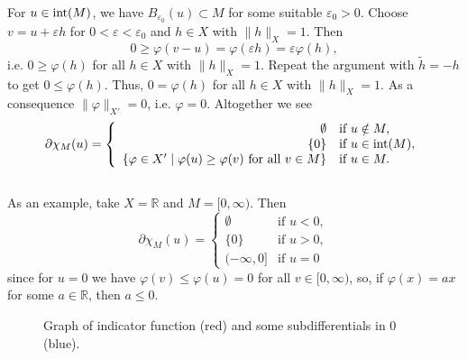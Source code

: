 For $u\in\operatorname{int}\mathopen{}\left(M\right)\mathclose{}$, we have $B_{\varepsilon_0}(u)\subset M$ for some suitable $\varepsilon_0>0$. Choose $v=u+\varepsilon h$ for $0<\varepsilon<\varepsilon_0$ and $h\in X$ with $\lVert h\rVert_X=1$. Then
\[0\geq\varphi(v-u)=\varphi(\varepsilon h)=\varepsilon\varphi(h),\]
i.e. $0\geq\varphi(h)$ for all $h\in X$ with $\lVert h\rVert_X=1$. Repeat the argument with $\tilde{h}=-h$ to get $0\leq\varphi(h)$. Thus, $0=\varphi(h)$ for all $h\in X$ with $\lVert h\rVert_X=1$. As a consequence $\lVert\varphi\rVert_{X'}=0$, i.e. $\varphi=0$. Altogether we see
\[\partial\chi_M(u)=\left\{\begin{array}{rl}
	\emptyset&\text{if }u\notin M,\\
	\{0\}&\text{if }u\in\operatorname{int}\mathopen{}\left(M\right)\mathclose{},\\
	\{\varphi\in X'\mid\varphi(u)\geq\varphi(v)\text{ for all }v\in M\}&\text{if }u\in M.
\end{array}\right.\]\\

As an example, take $X=\mathbb{R}$ and $M=[0,\infty)$. Then
\[\partial\chi_M(u)=\left\{\begin{array}{rl}
	\emptyset&\text{if }u<0,\\
	\{0\}&\text{if }u>0,\\
	(-\infty,0]&\text{if }u=0
\end{array}\right.\]
since for $u=0$ we have $\varphi(v)\leq\varphi(u)=0$ for all $v\in[0,\infty)$, so, if $\varphi(x)=ax$ for some $a\in\mathbb{R}$, then $a\leq0$.\\

\begin{figure}[ht]
	\centering
	\caption{Graph of indicator function (red) and some subdifferentials in 0 (blue).}
\end{figure}
\leavevmode\\[11pt]

